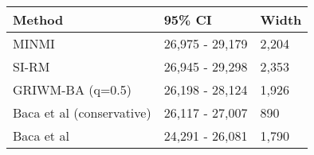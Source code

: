 
\begin{tabular}{lll}
\toprule
Method & 95\% CI & Width\\
\midrule
MINMI & 26,975 - 29,179 & 2,204\\
SI-RM & 26,945 - 29,298 & 2,353\\
GRIWM-BA (q=0.5) & 26,198 - 28,124 & 1,926\\
Baca et al (conservative) & 26,117 - 27,007 & 890\\
Baca et al & 24,291 - 26,081 & 1,790\\
\bottomrule
\end{tabular}
